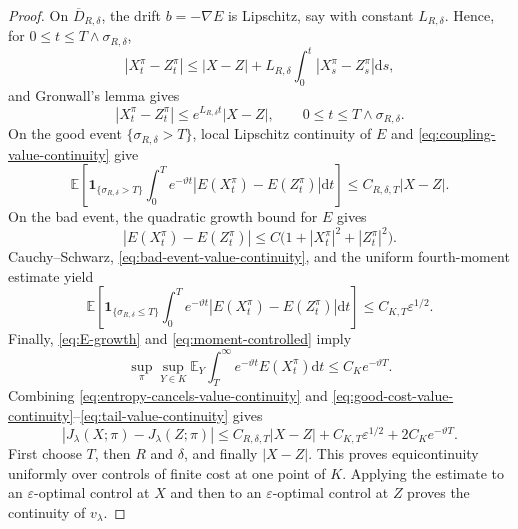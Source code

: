 \documentclass[11pt]{article}
\def\E{\mathbb{E}}
\def\id{\mathbf{1}}
\newcommand{\dd}{\mathrm{d}}
\theoremstyle{definition}
\theoremstyle{remark}
\numberwithin{equation}{section}
\begin{document}
\begin{proof}
On $\overline D_{R,\delta}$, the drift $b=-\nabla E$ is Lipschitz, say with constant
$L_{R,\delta}$.  Hence, for $0\le t\le T\wedge\sigma_{R,\delta}$,
\[
 |X_t^\pi-Z_t^\pi|
 \le |X-Z|+L_{R,\delta}\int_0^t|X_s^\pi-Z_s^\pi|\dd s,
\]
and Gronwall's lemma gives
\begin{equation}\label{eq:coupling-value-continuity}
 |X_t^\pi-Z_t^\pi|
 \le e^{L_{R,\delta}t}|X-Z|,
 \qquad 0\le t\le T\wedge\sigma_{R,\delta}.
\end{equation}
On the good event $\{\sigma_{R,\delta}>T\}$, local Lipschitz continuity of $E$ and
\eqref{eq:coupling-value-continuity} give
\begin{equation}\label{eq:good-cost-value-continuity}
 \E\left[\id_{\{\sigma_{R,\delta}>T\}}
 \int_0^T e^{-\vartheta t}|E(X_t^\pi)-E(Z_t^\pi)|\dd t\right]
 \le C_{R,\delta,T}|X-Z|.
\end{equation}
On the bad event, the quadratic growth bound for $E$ gives
\[
 |E(X_t^\pi)-E(Z_t^\pi)|
 \le C\bigl(1+|X_t^\pi|^2+|Z_t^\pi|^2\bigr).
\]
Cauchy--Schwarz, \eqref{eq:bad-event-value-continuity}, and the uniform fourth-moment estimate yield
\begin{equation}\label{eq:bad-cost-value-continuity}
 \E\left[\id_{\{\sigma_{R,\delta}\le T\}}
 \int_0^T e^{-\vartheta t}|E(X_t^\pi)-E(Z_t^\pi)|\dd t\right]
 \le C_{K,T}\varepsilon^{1/2}.
\end{equation}
Finally, \eqref{eq:E-growth} and \eqref{eq:moment-controlled} imply
\begin{equation}\label{eq:tail-value-continuity}
 \sup_\pi\sup_{Y\in K}
 \E_Y\int_T^\infty e^{-\vartheta t}E(X_t^\pi)\dd t
 \le C_Ke^{-\vartheta T}.
\end{equation}
Combining \eqref{eq:entropy-cancels-value-continuity} and
\eqref{eq:good-cost-value-continuity}--\eqref{eq:tail-value-continuity} gives
\begin{equation}\label{eq:cost-continuity-pre-DPP}
 |J_\lambda(X;\pi)-J_\lambda(Z;\pi)|
 \le C_{R,\delta,T}|X-Z|+C_{K,T}\varepsilon^{1/2}+2C_Ke^{-\vartheta T}.
\end{equation}
First choose $T$, then $R$ and $\delta$, and finally $|X-Z|$.  This proves equicontinuity uniformly
over controls of finite cost at one point of $K$.  Applying the estimate to an
$\varepsilon$-optimal control at $X$ and then to an $\varepsilon$-optimal control at $Z$ proves the
continuity of $v_\lambda$.
\end{proof}
\end{document}
